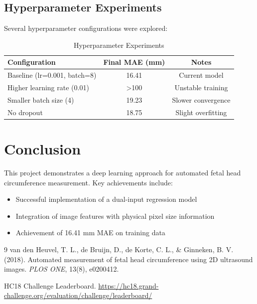 \documentclass{article}
\begin{document}
\subsection{Hyperparameter Experiments}
Several hyperparameter configurations were explored:

\begin{table}[H]
    \centering
    \caption{Hyperparameter Experiments}
    \begin{tabular}{lcc}
        \toprule
        Configuration & Final MAE (mm) & Notes \\
        \midrule
        Baseline (lr=0.001, batch=8) & 16.41 & Current model \\
        Higher learning rate (0.01) & \textgreater 100 & Unstable training \\
        Smaller batch size (4) & 19.23 & Slower convergence \\
        No dropout & 18.75 & Slight overfitting \\
        \bottomrule
    \end{tabular}
\end{table}

\section{Conclusion}
This project demonstrates a deep learning approach for automated fetal head circumference measurement. Key achievements include:
\begin{itemize}
    \item Successful implementation of a dual-input regression model
    \item Integration of image features with physical pixel size information
    \item Achievement of 16.41 mm MAE on training data
\end{itemize}

\begin{thebibliography}{9}
van den Heuvel, T. L., de Bruijn, D., de Korte, C. L., \& Ginneken, B. V. (2018).
\newblock Automated measurement of fetal head circumference using 2D ultrasound images.
\newblock \textit{PLOS ONE}, 13(8), e0200412.

HC18 Challenge Leaderboard.
\newblock \url{https://hc18.grand-challenge.org/evaluation/challenge/leaderboard/}
\end{thebibliography}
\end{document}
